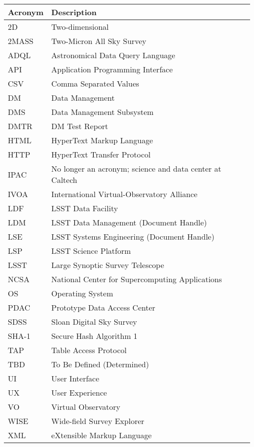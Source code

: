 \addtocounter{table}{-1}
\begin{longtable}{p{}p{}}\hline
\textbf{Acronym} & \textbf{Description}  \\\hline

2D & Two-dimensional \\\hline
2MASS & Two-Micron All Sky Survey \\\hline
ADQL & Astronomical Data Query Language \\\hline
API & Application Programming Interface \\\hline
CSV & Comma Separated Values \\\hline
DM & Data Management \\\hline
DMS & Data Management Subsystem \\\hline
DMTR & DM Test Report \\\hline
HTML & HyperText Markup Language \\\hline
HTTP & HyperText Transfer Protocol \\\hline
IPAC & No longer an acronym; science and data center at Caltech \\\hline
IVOA & International Virtual-Observatory Alliance \\\hline
LDF & LSST Data Facility \\\hline
LDM & LSST Data Management (Document Handle) \\\hline
LSE & LSST Systems Engineering (Document Handle) \\\hline
LSP & LSST Science Platform \\\hline
LSST & Large Synoptic Survey Telescope \\\hline
NCSA & National Center for Supercomputing Applications \\\hline
OS & Operating System \\\hline
PDAC & Prototype Data Access Center \\\hline
SDSS & Sloan Digital Sky Survey \\\hline
SHA-1 & Secure Hash Algorithm 1 \\\hline
TAP & Table Access Protocol \\\hline
TBD & To Be Defined (Determined) \\\hline
UI & User Interface \\\hline
UX & User Experience \\\hline
VO & Virtual Observatory \\\hline
WISE & Wide-field Survey Explorer \\\hline
XML & eXtensible Markup Language \\\hline
\end{longtable}
